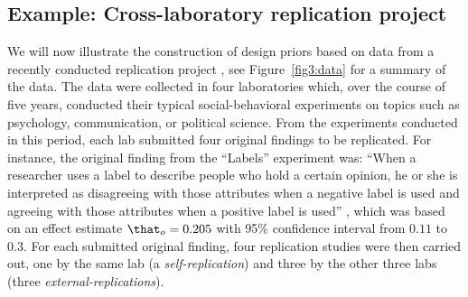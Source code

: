 \subsection{Example: Cross-laboratory replication project}
\label{sec3:example}
We will now illustrate the construction of design priors based on data from a
recently conducted replication project \citep{Protzko2020}, see
Figure~\ref{fig3:data} for a summary of the data. The data were collected in four
laboratories which, over the course of five years, conducted their typical
social-behavioral experiments on topics such as psychology, communication, or
political science. From the experiments conducted in this period, each lab
submitted four original findings to be replicated. For instance, the original
finding from the ``Labels'' experiment was: ``When a researcher uses a label to
describe people who hold a certain opinion, he or she is interpreted as
disagreeing with those attributes when a negative label is used and agreeing
with those attributes when a positive label is used'' \citep[p.
17]{Protzko2020}, which was based on an effect estimate
$\that_{o} = 0.205$ with 95\% confidence interval from
$0.11$ to $0.3$. For each submitted
original finding, four replication studies were then carried out, one by the
same lab (a \emph{self-replication}) and three by the other three labs (three
\emph{external-replications}).

